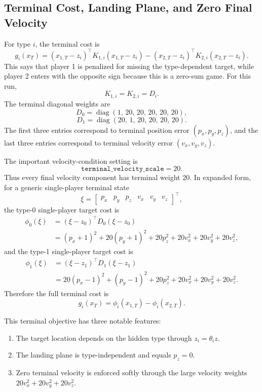 \documentclass[11pt]{article}
\begin{document}
\subsection{Terminal Cost, Landing Plane, and Zero Final Velocity}

For type $i$, the terminal cost is
\[
    g_i(x_T)
    =
    (x_{1,T}-z_i)^\top K_{1,i}(x_{1,T}-z_i)
    -
    (x_{2,T}-z_i)^\top K_{2,i}(x_{2,T}-z_i).
\]
This says that player 1 is penalized for missing the type-dependent target,
while player 2 enters with the opposite sign because this is a zero-sum game.
For this run,
\[
    K_{1,i}=K_{2,i}=D_i.
\]
The terminal diagonal weights are
\[
    D_0 =
    \operatorname{diag}(1,\,20,\,20,\,20,\,20,\,20),
\]
\[
    D_1 =
    \operatorname{diag}(20,\,1,\,20,\,20,\,20,\,20).
\]
The first three entries correspond to terminal position error
$(p_x,p_y,p_z)$, and the last three entries correspond to terminal velocity
error $(v_x,v_y,v_z)$.

The important velocity-condition setting is
\[
    \texttt{terminal\_velocity\_scale}=20.
\]
Thus every final velocity component has terminal weight $20$.  In expanded
form, for a generic single-player terminal state
\[
    \xi =
    \begin{bmatrix}
        p_x & p_y & p_z & v_x & v_y & v_z
    \end{bmatrix}^{\!\top},
\]
the type-0 single-player target cost is
\[
\begin{aligned}
    \phi_0(\xi)
    &=
    (\xi-z_0)^\top D_0(\xi-z_0) \\
    &=
    (p_x+1)^2
    +20(p_y+1)^2
    +20p_z^2
    +20v_x^2
    +20v_y^2
    +20v_z^2,
\end{aligned}
\]
and the type-1 single-player target cost is
\[
\begin{aligned}
    \phi_1(\xi)
    &=
    (\xi-z_1)^\top D_1(\xi-z_1) \\
    &=
    20(p_x-1)^2
    +(p_y-1)^2
    +20p_z^2
    +20v_x^2
    +20v_y^2
    +20v_z^2.
\end{aligned}
\]
Therefore the full terminal cost is
\[
    g_i(x_T)=\phi_i(x_{1,T})-\phi_i(x_{2,T}).
\]

This terminal objective has three notable features:
\begin{enumerate}[label=(\roman*)]
    \item The target location depends on the hidden type through
    $z_i=\theta_i z$.
    \item The landing plane is type-independent and equals $p_z=0$.
    \item Zero terminal velocity is enforced softly through the large velocity
    weights $20v_x^2+20v_y^2+20v_z^2$.
\end{enumerate}
\end{document}
